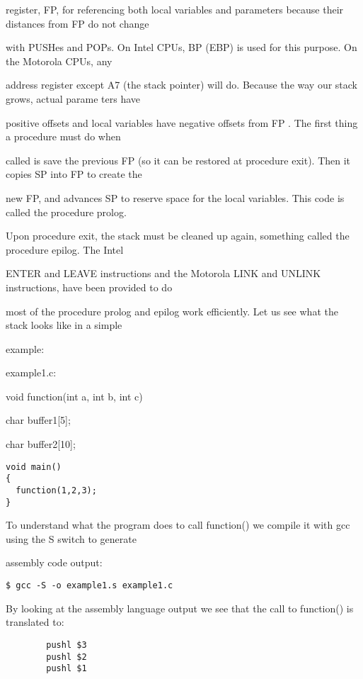 \documentclass[10pt]{article}
\begin{document}
register, FP, for referencing both local variables and parameters because their distances from FP do not change 

with PUSHes and POPs. On Intel CPUs, BP (EBP) is used for this purpose. On the Motorola CPUs, any 

address register except A7 (the stack pointer) will do. Because the way our stack grows, actual parame ters have 

positive offsets and local variables have negative offsets from FP . The first thing a procedure must do when 

called is save the previous FP (so it can be restored at procedure exit). Then it copies SP into FP to create the 

new FP, and advances SP to reserve space for the local variables. This code is called  the procedure prolog. 

Upon procedure exit, the stack must be cleaned up again, something called  the procedure epilog. The Intel  

ENTER and LEAVE instructions and the Motorola LINK and UNLINK  instructions, have been provided to do 

most of the procedure prolog and epilog work efficiently. Let us see what the stack looks like in a simple 

example:

example1.c: 

void function(int a, int b, int c) {

   char buffer1[5];

   char buffer2[10];

}

\begin{lstlisting}
void main() 
{
  function(1,2,3);
}
\end{lstlisting}

To understand what the program does to call function() we compile it with gcc using the  S switch to generate 

assembly code output: 

\begin{lstlisting}
$ gcc -S -o example1.s example1.c
\end{lstlisting}

By looking at the assembly language output we see that the call to function() is translated to:

\begin{lstlisting}
        pushl $3
        pushl $2
        pushl $1
\end{lstlisting}
\end{document}
